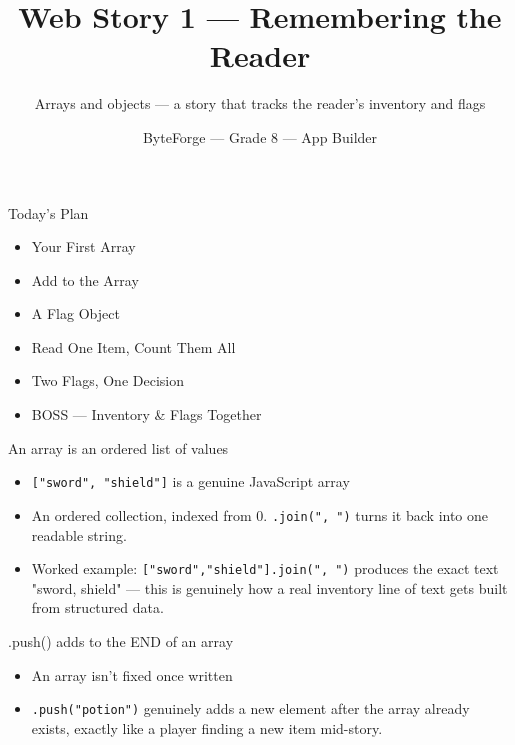\documentclass[aspectratio=169]{beamer}
\title{Web Story 1 — Remembering the Reader}
\subtitle{Arrays and objects — a story that tracks the reader's inventory and flags}
\author{ByteForge --- Grade 8 --- App Builder}
\date{}
\begin{document}
\begin{frame}
    \titlepage
\end{frame}

\begin{frame}{Today's Plan}
    \begin{itemize}
        \item Your First Array
        \item Add to the Array
        \item A Flag Object
        \item Read One Item, Count Them All
        \item Two Flags, One Decision
        \item[$\bigstar$] BOSS --- Inventory \& Flags Together
    \end{itemize}
\end{frame}

\begin{frame}{An array is an ordered list of values}
    \large
    \begin{itemize}
        \item \texttt{["sword", "shield"]} is a genuine JavaScript array
        \item An ordered collection, indexed from 0. \texttt{.join(", ")} turns it back into one readable string.
        \item Worked example: \texttt{["sword","shield"].join(", ")} produces the exact text "sword, shield" — this is genuinely how a real inventory line of text gets built from structured data.
    \end{itemize}

    \begin{center}
    \end{center}
\end{frame}


\begin{frame}{.push() adds to the END of an array}
    \large
    \begin{itemize}
        \item An array isn't fixed once written
        \item \texttt{.push("potion")} genuinely adds a new element after the array already exists, exactly like a player finding a new item mid-story.
    \end{itemize}
\end{frame}
\end{document}
